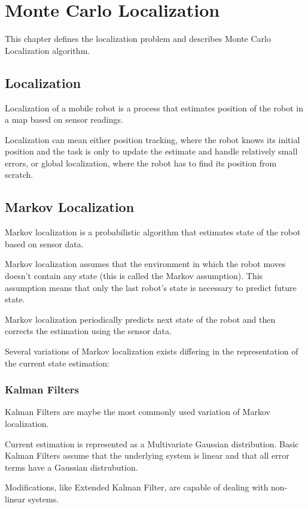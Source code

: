 \chapter{Monte Carlo Localization}
\label{chap:mcl}

This chapter defines the localization problem and describes Monte Carlo Localization algorithm.

\section{Localization}
Localization of a mobile robot is a process that estimates position of the robot
in a map based on sensor readings.

Localization can mean either position tracking, where the robot knows its initial
position and the task is only to update the estimate and handle relatively small
errors, or global localization, where the robot has to find its position from scratch.

\section{Markov Localization}

Markov localization is a probabilistic algorithm that estimates state of the
robot based on sensor data.

Markov localization assumes that the environment in which the robot moves
doesn't contain any state (this is called the Markov assumption).
This assumption means that only the last robot's state is necessary to predict
future state.

Markov localization periodically predicts next state of the robot and then
corrects the estimation using the sensor data.

Several variations of Markov localization exists differing in the
representation of the current state estimation:

\subsection{Kalman Filters}
Kalman Filters are maybe the most commonly used variation of Markov localization.

Current estimation is represented as a Multivariate Gaussian distribution.
Basic Kalman Filters assume that the underlying system is linear and that
all error terms have a Gaussian distrubution.

Modifications, like Extended Kalman Filter, are capable of dealing with
non-linear systems.

